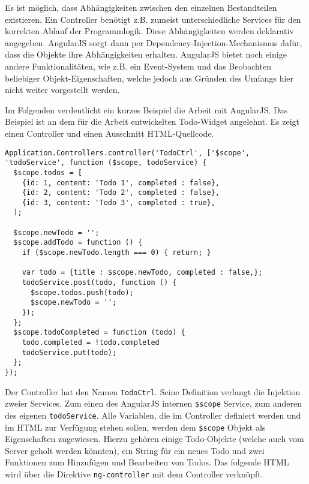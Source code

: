 Es ist möglich, dass Abhängigkeiten zwischen den einzelnen Bestandteilen existieren. Ein Controller benötigt z.B. zumeist unterschiedliche Services für den korrekten Ablauf der Programmlogik. Diese Abhängigkeiten werden deklarativ angegeben. AngularJS sorgt dann per Dependency-Injection-Mechanismus dafür, dass die Objekte ihre Abhängigkeiten erhalten. AngularJS bietet noch einige andere Funktionalitäten, wie z.B. ein Event-System und das Beobachten beliebiger Objekt-Eigenschaften, welche jedoch aus Gründen des Umfangs hier nicht weiter vorgestellt werden.

Im Folgenden verdeutlicht ein kurzes Beispiel die Arbeit mit AngularJS. Das Beispiel ist an dem für die Arbeit entwickelten Todo-Widget angelehnt. Es zeigt einen Controller und einen Ausschnitt \ac{HTML}-Quellcode.

\begin{lstlisting}
Application.Controllers.controller('TodoCtrl', ['$scope', 'todoService', function ($scope, todoService) {
  $scope.todos = [
    {id: 1, content: 'Todo 1', completed : false},
    {id: 2, content: 'Todo 2', completed : false},
    {id: 3, content: 'Todo 3', completed : true},
  ];
  
  $scope.newTodo = '';
  $scope.addTodo = function () {
    if ($scope.newTodo.length === 0) { return; }

    var todo = {title : $scope.newTodo, completed : false,};
    todoService.post(todo, function () {
      $scope.todos.push(todo);
      $scope.newTodo = '';
    });
  };
  $scope.todoCompleted = function (todo) {
    todo.completed = !todo.completed
    todoService.put(todo);
  };
});
\end{lstlisting}
Der Controller hat den Namen \texttt{TodoCtrl}. Seine Definition verlangt die Injektion zweier Services. Zum einen des AngularJS internen \texttt{\$scope} Service, zum anderen des eigenen \texttt{todoService}. Alle Variablen, die im Controller definiert werden und im \ac{HTML} zur Verfügung stehen sollen, werden dem \texttt{\$scope} Objekt als Eigenschaften zugewiesen. Hierzu gehören einige Todo-Objekte (welche auch vom Server geholt werden könnten), ein String für ein neues Todo und zwei Funktionen zum Hinzufügen und Bearbeiten von Todos. Das folgende \ac{HTML} wird über die Direktive \texttt{ng-controller} mit dem Controller verknüpft.

